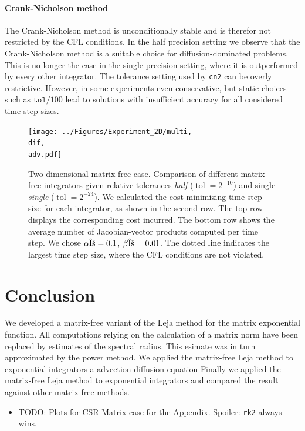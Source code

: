 \documentclass{scrartcl}
\begin{document}
	\paragraph{Crank-Nicholson method}
	The Crank-Nicholson method is unconditionally stable and is therefor not restricted by the CFL conditions. In the half precision setting we observe that the Crank-Nicholson method is a suitable choice for diffusion-dominated problems. This is no longer the case in the single precision setting, where it is outperformed by every other integrator. The tolerance setting used by \texttt{cn2} can be overly restrictive. However, in some experiments even conservative, but static choices such as $\texttt{tol}/100$ lead to solutions with insufficient accuracy for all considered time step sizes.
	
	\begin{figure}[t]
	\newcommand{\dif}{\detokenize{α}=0.1}
	\newcommand{\adv}{\detokenize{β}=0.01}
	\centering
	\texttt{[image: ../Figures/Experiment\_2D/multi, \\dif, \\adv.pdf]}
	\caption{Two-dimensional matrix-free case. Comparison of different matrix-free integrators given relative tolerances \textit{half} ($\operatorname{tol} = 2^{-10}$) and single \textit{single} ($\operatorname{tol} = 2^{-24}$). We calculated the cost-minimizing time step size for each integrator, as shown in the second row. The top row displays the corresponding cost incurred. The bottom row shows the average number of Jacobian-vector products computed per time step. We chose $\alpha\dif$, $\beta\adv$. The dotted line indicates the largest time step size, where the CFL conditions are not violated.}
	\label{fig:multi2DNonlinear}
	\end{figure}
	
	\section{Conclusion}
	We developed a matrix-free variant of the Leja method for the matrix exponential function. All computations relying on the calculation of a matrix norm have been replaced by estimates of the spectral radius. This esimate was in turn approximated by the power method. We applied the matrix-free Leja method to exponential integrators a advection-diffusion equation   Finally we applied the matrix-free Leja method to exponential integrators and compared the result against other matrix-free methods.


\begin{itemize}
	\item TODO: Plots for CSR Matrix case for the Appendix. Spoiler: \texttt{rk2} always wins.
\end{itemize}
\end{document}
